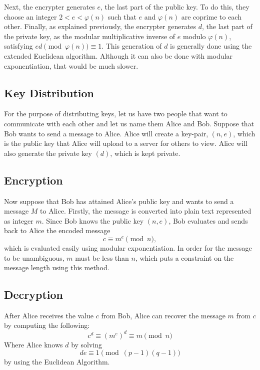 \documentclass{article}
\begin{document}
Next, the encrypter generates $e$, the last part of the public key. To do this, they choose an integer $2<e< \varphi(n)$ such that $e$ and $\varphi(n)$ are coprime to each other. Finally, as explained previously, the encrypter generates $d$, the last part of the private key, as the modular multiplicative inverse of $e$ modulo $\varphi(n)$, satisfying $ed \pmod {\varphi(n)} \equiv 1$. This generation of $d$ is generally done using the extended Euclidean algorithm. Although it can also be done with modular exponentiation, that would be much slower.

\subsection{Key Distribution}
For the purpose of distributing keys, let us have two people that want to communicate with each other and let us name them Alice and Bob. Suppose that Bob wants to send a message to Alice. Alice will create a key-pair, $(n, e)$, which is the public key that Alice will upload to a server for others to view. Alice will also generate the private key $(d)$, which is kept private.

\subsection{Encryption} 
Now suppose that Bob has attained Alice's public key and wants to send a  message $M$ to Alice. Firstly, the message is converted into plain text represented as integer $m$. Since Bob knows the public key $(n, e)$, Bob evaluates and sends back to Alice the encoded message $$c \equiv m^e\pmod{n},$$ which is evaluated easily using modular exponentiation. In order for the message to be unambiguous, $m$ must be less than $n$, which puts a constraint on the message length using this method.
\subsection{Decryption}
After Alice receives the value $c$ from Bob, Alice can recover the message $m$ from $c$ by computing the following:
$$c^d \equiv (m^e)^d \equiv m \pmod{n}$$
Where Alice knows $d$ by solving
$$de \equiv 1\pmod{(p-1)(q-1)}$$ by using the Euclidean Algorithm. 
\end{document}
